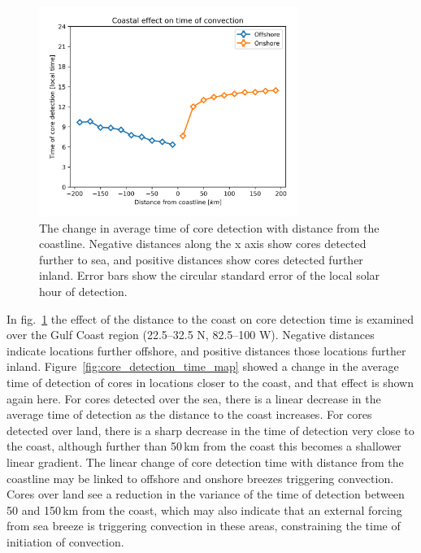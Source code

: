 \begin{figure}[tp]
    \centering
    \includegraphics[width=0.75\textwidth]{figures/chapter2_14.png}
    \caption[
    The change in average time of core detection with distance from the coastline
    ]{
    The change in average time of core detection with distance from the coastline. Negative distances along the x axis show cores detected further to sea, and positive distances show cores detected further inland. Error bars show the circular standard error of the local solar hour of detection.
    }
    \label{fig:core_coast_effect}
\end{figure}

In fig.~\ref{fig:core_coast_effect} the effect of the distance to the coast on core detection time is examined over the Gulf Coast region (22.5--32.5\,\textdegree\,N, 82.5--100\,\textdegree\,W).
Negative distances indicate locations further offshore, and positive distances those locations further inland.
Figure~\ref{fig:core_detection_time_map} showed a change in the average time of detection of cores in locations closer to the coast, and that effect is shown again here.
For cores detected over the sea, there is a linear decrease in the average time of detection as the distance to the coast increases.
For cores detected over land, there is a sharp decrease in the time of detection very close to the coast, although further than 50\,\unit{km} from the coast this becomes a shallower linear gradient.
The linear change of core detection time with distance from the coastline may be linked to offshore and onshore breezes triggering convection.
Cores over land see a reduction in the variance of the time of detection between 50 and 150\,\unit{km} from the coast, which may also indicate that an external forcing from sea breeze is triggering convection in these areas, constraining the time of initiation of convection.

